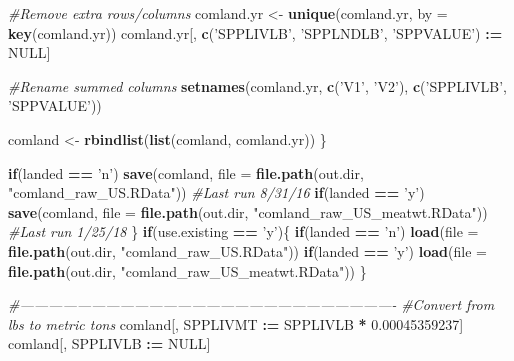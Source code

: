 \documentclass[]{article}
\newenvironment{Shaded}{\begin{snugshade}}{\end{snugshade}}
\newcommand{\KeywordTok}[1]{\textcolor[rgb]{0.13,0.29,0.53}{\textbf{#1}}}
\newcommand{\DataTypeTok}[1]{\textcolor[rgb]{0.13,0.29,0.53}{#1}}
\newcommand{\FloatTok}[1]{\textcolor[rgb]{0.00,0.00,0.81}{#1}}
\newcommand{\StringTok}[1]{\textcolor[rgb]{0.31,0.60,0.02}{#1}}
\newcommand{\CommentTok}[1]{\textcolor[rgb]{0.56,0.35,0.01}{\textit{#1}}}
\newcommand{\OtherTok}[1]{\textcolor[rgb]{0.56,0.35,0.01}{#1}}
\newcommand{\ControlFlowTok}[1]{\textcolor[rgb]{0.13,0.29,0.53}{\textbf{#1}}}
\newcommand{\OperatorTok}[1]{\textcolor[rgb]{0.81,0.36,0.00}{\textbf{#1}}}
\newcommand{\ErrorTok}[1]{\textcolor[rgb]{0.64,0.00,0.00}{\textbf{#1}}}
\newcommand{\NormalTok}[1]{#1}
\begin{document}
\begin{Shaded}
\begin{Highlighting}[]
{    \CommentTok{#Remove extra rows/columns}
\NormalTok{    comland.yr <-}\StringTok{ }\KeywordTok{unique}\NormalTok{(comland.yr, }\DataTypeTok{by =} \KeywordTok{key}\NormalTok{(comland.yr))}
\NormalTok{    comland.yr[, }\KeywordTok{c}\NormalTok{(}\StringTok{'SPPLIVLB'}\NormalTok{, }\StringTok{'SPPLNDLB'}\NormalTok{, }\StringTok{'SPPVALUE'}\NormalTok{) }\OperatorTok{:}\ErrorTok{=}\StringTok{ }\OtherTok{NULL}\NormalTok{]}
    
    \CommentTok{#Rename summed columns}
    \KeywordTok{setnames}\NormalTok{(comland.yr, }\KeywordTok{c}\NormalTok{(}\StringTok{'V1'}\NormalTok{, }\StringTok{'V2'}\NormalTok{), }\KeywordTok{c}\NormalTok{(}\StringTok{'SPPLIVLB'}\NormalTok{, }\StringTok{'SPPVALUE'}\NormalTok{))}
    
\NormalTok{    comland <-}\StringTok{ }\KeywordTok{rbindlist}\NormalTok{(}\KeywordTok{list}\NormalTok{(comland, comland.yr))}
\NormalTok{  \}}
  
  \ControlFlowTok{if}\NormalTok{(landed }\OperatorTok{==}\StringTok{ 'n'}\NormalTok{) }\KeywordTok{save}\NormalTok{(comland, }\DataTypeTok{file =} \KeywordTok{file.path}\NormalTok{(out.dir, }\StringTok{"comland_raw_US.RData"}\NormalTok{))}
  \CommentTok{#Last run 8/31/16}
  \ControlFlowTok{if}\NormalTok{(landed }\OperatorTok{==}\StringTok{ 'y'}\NormalTok{) }\KeywordTok{save}\NormalTok{(comland, }\DataTypeTok{file =} \KeywordTok{file.path}\NormalTok{(out.dir, }\StringTok{"comland_raw_US_meatwt.RData"}\NormalTok{))}
  \CommentTok{#Last run 1/25/18 }
\NormalTok{\}}
\ControlFlowTok{if}\NormalTok{(use.existing }\OperatorTok{==}\StringTok{ 'y'}\NormalTok{)\{}
  \ControlFlowTok{if}\NormalTok{(landed }\OperatorTok{==}\StringTok{ 'n'}\NormalTok{) }\KeywordTok{load}\NormalTok{(}\DataTypeTok{file =} \KeywordTok{file.path}\NormalTok{(out.dir, }\StringTok{"comland_raw_US.RData"}\NormalTok{))}
  \ControlFlowTok{if}\NormalTok{(landed }\OperatorTok{==}\StringTok{ 'y'}\NormalTok{) }\KeywordTok{load}\NormalTok{(}\DataTypeTok{file =} \KeywordTok{file.path}\NormalTok{(out.dir, }\StringTok{"comland_raw_US_meatwt.RData"}\NormalTok{))  }
\NormalTok{\}}

\CommentTok{#-------------------------------------------------------------------------------}
\CommentTok{#Convert from lbs to metric tons}
\NormalTok{comland[, SPPLIVMT }\OperatorTok{:}\ErrorTok{=}\StringTok{ }\NormalTok{SPPLIVLB }\OperatorTok{*}\StringTok{ }\FloatTok{0.00045359237}\NormalTok{]}
\NormalTok{comland[, SPPLIVLB }\OperatorTok{:}\ErrorTok{=}\StringTok{ }\OtherTok{NULL}\NormalTok{]}

}
\end{Highlighting}
\end{Shaded}
\end{document}
